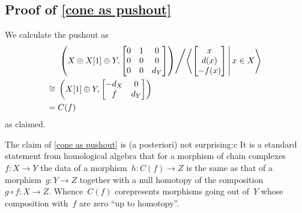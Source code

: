 \documentclass[a4paper,10pt]{scrartcl}
\begin{document}
\subsection{Proof of \cref{cone as pushout}}
\label{cone as pushout proof}

We calculate the pushout as
\begin{align*}
  {}&
  \left.
  \left(
    X \oplus X[1] \oplus Y,
    \begin{bmatrix}
      0 & 1 & 0   \\
      0 & 0 & 0   \\
      0 & 0 & d_Y
    \end{bmatrix}
  \right)
  \middle/
  \gen*{
    \begin{bmatrix}
          x  \\
        d(x) \\
      -f(x)
    \end{bmatrix}
  \suchthat*
    x \in X
  }
  \right.
  \\
  \cong{}&
  \left(
    X[1] \oplus Y,
    \begin{bmatrix}
      -d_X & 0   \\
        f   & d_Y
    \end{bmatrix}
  \right)
  \\
  ={}&
  C(f)
\end{align*}
as claimed.

\begin{remark}
  The claim of \cref{cone as pushout} is (a posteriori) not  surprising:c
  It is a standard statement from homological algebra that for a morphism of chain complexes~$f \colon X \to Y$ the data of a morphism~$h \colon C(f) \to Z$ is the same as that of a morphism~$g \colon Y \to Z$ together with a null homotopy of the composition~$g \circ f \colon X \to Z$.
  Whence~$C(f)$ corepresents morphisms going out of~$Y$ whose composition with~$f$ are zero \enquote{up to homotopy}.
\end{remark}
\end{document}
